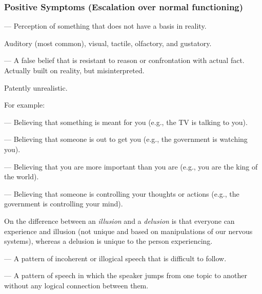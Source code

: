 \subsubsection{Positive Symptoms (Escalation over normal functioning)}

\begin{coloredlist}
    \item {} — Perception of something that does not have a basis in reality.
    \begin{coloredlist}
        \item Auditory (most common), visual, tactile, olfactory, and gustatory.
    \end{coloredlist}
    \item {} — A false belief that is resistant to reason or confrontation with actual fact. Actually built on reality, but misinterpreted.
    \begin{coloredlist}
        \item Patently unrealistic.
        \item For example:
        \begin{coloredlist}
            \item {} — Believing that something is meant for you (e.g., the TV is talking to you).
            \item {} — Believing that someone is out to get you (e.g., the government is watching you).
            \item {} — Believing that you are more important than you are (e.g., you are the king of the world).
            \item {} — Believing that someone is controlling your thoughts or actions (e.g., the government is controlling your mind).
        \end{coloredlist}
        \item On the difference between an \textit{illusion} and a \textit{delusion} is that everyone can experience and illusion (not unique and based on manipulations of our nervous systems), whereas a delusion is unique to the person experiencing.
    \end{coloredlist}
    \item {} — A pattern of incoherent or illogical speech that is difficult to follow.
    \begin{coloredlist}
        \item {} — A pattern of speech in which the speaker jumps from one topic to another without any logical connection between them.

\end{coloredlist}
\end{coloredlist}
